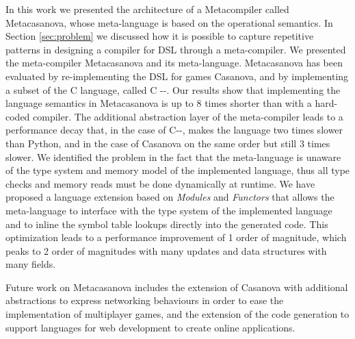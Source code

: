 In this work we presented the architecture of a Metacompiler called Metacasanova, whose meta-language is based on the operational semantics. In Section \ref{sec:problem} we discussed how it is possible to capture repetitive patterns in designing a compiler for DSL through a meta-compiler. We presented the meta-compiler Metacasanova and its meta-language. Metacasanova has been evaluated by re-implementing the DSL for games Casanova, and by implementing a subset of the C language, called C -{}-. Our results show that implementing the language semantics in Metacasanova is up to 8 times shorter than with a hard-coded compiler. The additional abstraction layer of the meta-compiler leads to a performance decay that, in the case of C-{}-, makes the language two times slower than Python, and in the case of Casanova on the same order but still 3 times slower. We identified the problem in the fact that the meta-language is unaware of the type system and memory model of the implemented language, thus all type checks and memory reads must be done dynamically at runtime. We have proposed a language extension based on \textit{Modules} and \textit{Functors} that allows the meta-language to interface with the type system of the implemented language and to inline the symbol table lookups directly into the generated code. This optimization leads to a performance improvement of 1 order of magnitude, which peaks to 2 order of magnitudes with many updates and data structures with many fields. 

Future work on Metacasanova includes the extension of Casanova with additional abstractions to express networking behaviours in order to ease the implementation of multiplayer games, and the extension of the code generation to support languages for web development to create online applications.